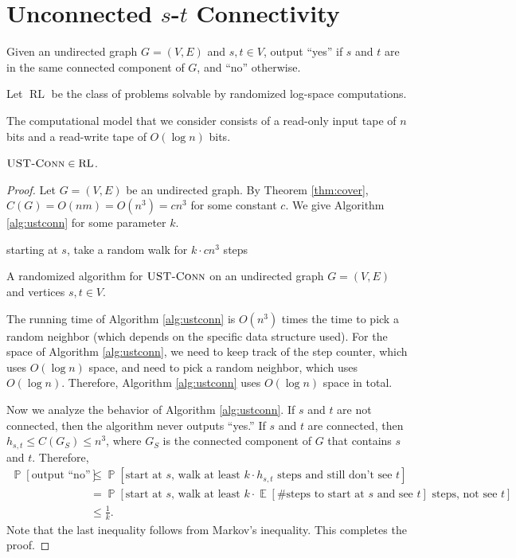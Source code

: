 \documentclass[letterpaper, reqno,11pt]{article}
\newcommand{\PP}{\mathop{{}\mathbb{P}}}
\newcommand{\EE}{\mathop{{}\mathbb{E}}}
\DeclareMathOperator{\ustconn}{\textsc{UST-Conn}}
\DeclareMathOperator{\RL}{RL}
\begin{document}
\section{Unconnected $s$-$t$ Connectivity}

\begin{problem}[undirected $s$-$t$ connectivity, $\ustconn$]
  Given an undirected graph $G = (V, E)$ and $s, t \in V$, output ``yes'' if $s$ and $t$ are in the same connected component of $G$, and ``no'' otherwise.
\end{problem}

\begin{definition}
  Let $\RL$ be the class of problems solvable by randomized log-space computations.
\end{definition}

The computational model that we consider consists of a read-only input tape of $n$ bits and a read-write tape of $O(\log n)$ bits.

\begin{theorem}
  $\ustconn \in \RL$.
\end{theorem}

\begin{proof}
  Let $G = (V, E)$ be an undirected graph. By Theorem \ref{thm:cover}, $C(G) = O(nm) = O(n^3) = cn^3$ for some constant $c$. We give Algorithm \ref{alg:ustconn} for some parameter $k$.

  \begin{algorithm}
    starting at $s$, take a random walk for $k \cdot c n^3$ steps \\
    \caption{A randomized algorithm for $\ustconn$ on an undirected graph $G = (V, E)$ and vertices $s, t \in V$.}
    \label{alg:ustconn}
  \end{algorithm}

  The running time of Algorithm \ref{alg:ustconn} is $O(n^3)$ times the time to pick a random neighbor (which depends on the specific data structure used). For the space of Algorithm \ref{alg:ustconn}, we need to keep track of the step counter, which uses $O(\log n)$ space, and need to pick a random neighbor, which uses $O(\log n)$. Therefore, Algorithm \ref{alg:ustconn} uses $O(\log n)$ space in total.

  Now we analyze the behavior of Algorithm \ref{alg:ustconn}. If $s$ and $t$ are not connected, then the algorithm never outputs ``yes.'' If $s$ and $t$ are connected, then $h_{s, t} \leq C(G_S) \leq n^3$, where $G_S$ is the connected component of $G$ that contains $s$ and $t$. Therefore,
  \begin{align*}
    \PP[\text{output ``no''}] &\leq \PP[\text{start at $s$, walk at least $k \cdot h_{s, t}$ steps and still don't see $t$}] \\
    &= \PP[\text{start at $s$, walk at least $k \cdot \EE[\text{\# steps to start at $s$ and see $t$}]$ steps, not see $t$}] \\
    &\leq \frac{1}{k}.
  \end{align*}
  Note that the last inequality follows from Markov's inequality. This completes the proof.
\end{proof}
\end{document}
